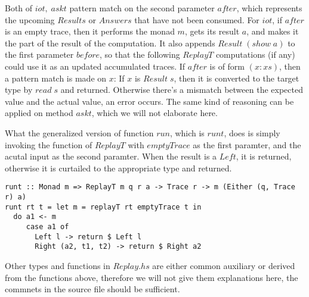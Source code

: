 \documentclass[10pt]{article}
\begin{document}
Both of $iot,\; askt$ pattern match on the second parameter $after$, which represents the upcoming $Results$ or $Answers$ that have not  been consumed. For $iot$, if $after$ is an empty trace, then it performs the monad $m$, gets its result $a$, and makes it the part of the result of the computation. It also appends $Result\; (show\; a)$ to the first parameter $before$, so that the following $ReplayT$ computations (if any) could use it as an updated accumulated traces. If $after$ is of form $(x:xs)$, then a pattern match is made on $x$: If $x$ is $Result\; s$, then it is converted to the target type by $read\; s$ and returned. Otherwise there's a mismatch between the expected value and the actual value, an error occurs. The same kind of reasoning can be applied on method $askt$, which we will not elaborate here.

What the generalized version of function $run$, which is $runt$, does is simply invoking the function of $ReplayT$ with $emptyTrace$ as the first paramter, and the acutal input as the second paramter. When the result is a $Left$, it is returned, otherwise it is curtailed to the appropriate type and returned.
\begin{lstlisting}
runt :: Monad m => ReplayT m q r a -> Trace r -> m (Either (q, Trace r) a)                                                                                                                    
runt rt t = let m = replayT rt emptyTrace t in                                                                                                                                                
  do a1 <- m                                                                                                                                                                                  
     case a1 of                                                                                                                                                                               
       Left l -> return $ Left l                                                                                                                                                              
       Right (a2, t1, t2) -> return $ Right a2
\end{lstlisting}

Other types and functions in $Replay.hs$ are either common auxiliary or derived from the functions above, therefore we will not give them explanations here, the commnets in the source file should be sufficient.
\end{document}
